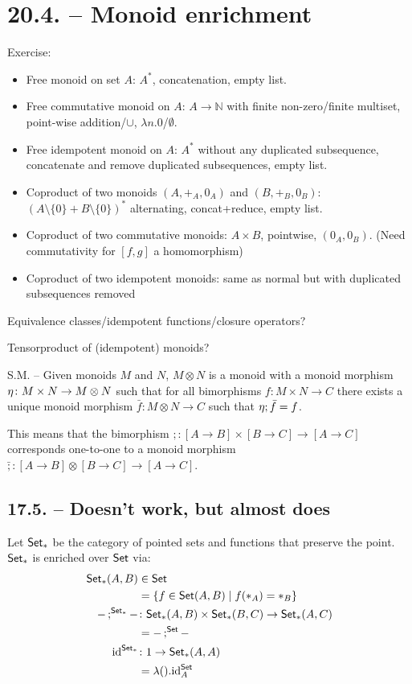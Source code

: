 \documentclass[runningheads,envcountsame]{llncs}
\begin{document}
\section{20.4. -- Monoid enrichment}

Exercise:
\begin{itemize}
    \item Free monoid on set $A$: $A^*$, concatenation, empty list.
    \item Free commutative monoid on $A$: $A \to \mathbb{N}$ with finite non-zero/finite multiset, point-wise addition/$\cup$, $\lambda n. 0$/$\emptyset$.
    \item Free idempotent monoid on $A$: $A^*$ without any duplicated subsequence, 
    concatenate and remove duplicated subsequences, empty list.
    \item Coproduct of two monoids $(A, +_A, 0_A)$ and $(B, +_B, 0_B)$: $(A\setminus\{0\} + B\setminus\{0\})^*$ alternating, concat+reduce, empty list. 
    \item Coproduct of two commutative monoids: $A \times B$, pointwise, $(0_A, 0_B)$. (Need commutativity for $[f, g]$ a homomorphism)
    \item Coproduct of two idempotent monoids: same as normal but with duplicated subsequences removed
\end{itemize}

Equivalence classes/idempotent functions/closure operators?

Tensorproduct of (idempotent) monoids?

S.M. -- Given monoids $M$ and $N$, $M \otimes N$ is a monoid with a monoid morphism $\munit\colon M \times N \to M \otimes N$ such that for all bimorphisms $f\colon M \times N \to C$ there exists a unique monoid morphism $\bar f\colon M \otimes N \to C$ such that $\munit ; \bar f = f$.

This means that the bimorphism $; \colon [A \to B] \times [B \to C] \to [A\to C]$ corresponds one-to-one to a monoid morphism $\bar ;\colon [A \to B] \otimes [B \to C] \to [A\to C]$. 


\subsection{17.5. -- Doesn't work, but almost does}

Let $\mathsf{Set}_*$ be the category of pointed sets and functions that preserve the point. $\mathsf{Set}_*$ is enriched over $\mathsf{Set}$ via:
\begin{align}
    \homSetP{A}{B} &\in \Set \\
                   &= \{ f \in \homSet{A}{B} \mid f(*_A) = *_B \} \\
    \comp[\SetP]{-}{-} &\colon \homSetP{A}{B} \times \homSetP{B}{C} \to  \homSetP{A}{C} \\
                       &= \comp[\Set]{-}{-} \\
    \id^{\SetP} &\colon 1 \to \homSetP{A}{A} \\
                &= \lambda (). \id^{\Set}_A
\end{align}
\end{document}
